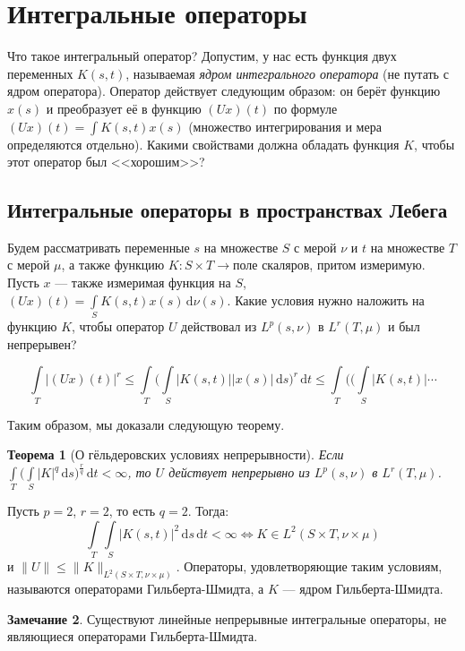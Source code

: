 \documentclass[11pt,openany,a4paper]{scrartcl}
\theoremstyle{plain}
\newtheorem{theorem}{Теорема}[section]
\theoremstyle{definition}
\newtheorem{remark}[theorem]{Замечание}
\newcommand{\dif}{\, \mathrm d}
\begin{document}
\section{Интегральные операторы}

Что такое интегральный оператор? Допустим, у нас есть функция двух переменных
$K(s, t)$, называемая \emph{ядром интегрального оператора} (не путать с ядром
оператора). Оператор действует следующим образом: он берёт функцию $x(s)$ и
преобразует её в функцию $(Ux)(t)$ по формуле
$(Ux)(t) = \int K(s, t) x(s)$ (множество интегрирования и мера определяются 
отдельно). Какими свойствами должна обладать функция $K$,
чтобы этот оператор был <<хорошим>>?

\subsection{Интегральные операторы в пространствах Лебега}

Будем рассматривать переменные $s$ на множестве $S$ с мерой $\nu$ и $t$
на множестве $T$ с мерой $\mu$, а также функцию
$K: S \times T \to \text{поле скаляров}$, притом измеримую. Пусть $x$ — также
измеримая функция на $S$, $(Ux)(t) = \int\limits_S K(s, t)x(s)\dif \nu(s)$.
Какие условия нужно наложить на функцию $K$, чтобы оператор $U$ действовал из
$L^p(s, \nu)$ в $L^r(T, \mu)$ и был непрерывен?

$$
\int\limits_T |(Ux)(t)|^r \leqslant \int\limits_T
\bigg(\int\limits_S|K(s, t)||x(s)|\dif s\bigg)^r \dif t \leqslant
\int\limits_T\bigg(\bigg(\int\limits_S |K(s, t)| \cdots
$$

Таким образом, мы доказали следующую теорему.

\begin{theorem}[О гёльдеровских условиях непрерывности]
    Если $\int\limits_T\bigg(\int\limits_S |K|^q \dif s\bigg)^\frac{r}{q} \dif t
    < \infty$, то $U$ действует непрерывно из $L^p(s, \nu)$ в $L^r(T, \mu)$.
\end{theorem}

Пусть $p = 2$, $r = 2$, то есть $q = 2$. Тогда:
$$
\int\limits_T \int\limits_S |K(s, t)|^2 \dif s \dif t < \infty \iff
K \in L^2(S\times T, \nu \times \mu)
$$
и $\|U\|\leqslant \|K\|_{L^2(S\times T, \nu\times \mu)}$. Операторы, 
удовлетворяющие таким условиям, называются операторами Гильберта-Шмидта, а
$K$ — ядром Гильберта-Шмидта.
\begin{remark}
    Существуют линейные непрерывные интегральные операторы, не являющиеся
    операторами Гильберта-Шмидта.
\end{remark}
\end{document}
